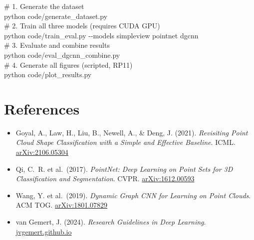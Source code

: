 \documentclass[12pt,a4paper]{article}
\begin{document}
\begin{codebox}
\# 1. Generate the dataset\\
python code/generate\_dataset.py\\[4pt]
\# 2. Train all three models (requires CUDA GPU)\\
python code/train\_eval.py -{}-models simpleview pointnet dgcnn\\[4pt]
\# 3. Evaluate and combine results\\
python code/eval\_dgcnn\_combine.py\\[4pt]
\# 4. Generate all figures (scripted, RP11)\\
python code/plot\_results.py
\end{codebox}

\section*{References}

\begin{itemize}[leftmargin=2em, label={}, itemsep=3pt]
  \item Goyal, A., Law, H., Liu, B., Newell, A., \& Deng, J. (2021). \textit{Revisiting Point Cloud Shape Classification with a Simple and Effective Baseline}. ICML. \href{https://arxiv.org/abs/2106.05304}{arXiv:2106.05304}
  \item Qi, C.\ R. et al.\ (2017). \textit{PointNet: Deep Learning on Point Sets for 3D Classification and Segmentation}. CVPR. \href{https://arxiv.org/abs/1612.00593}{arXiv:1612.00593}
  \item Wang, Y. et al.\ (2019). \textit{Dynamic Graph CNN for Learning on Point Clouds}. ACM TOG. \href{https://arxiv.org/abs/1801.07829}{arXiv:1801.07829}
  \item van Gemert, J. (2024). \textit{Research Guidelines in Deep Learning}. \href{https://jvgemert.github.io/ResearchGuidelinesInDL.pdf}{jvgemert.github.io}
\end{itemize}
\end{document}
